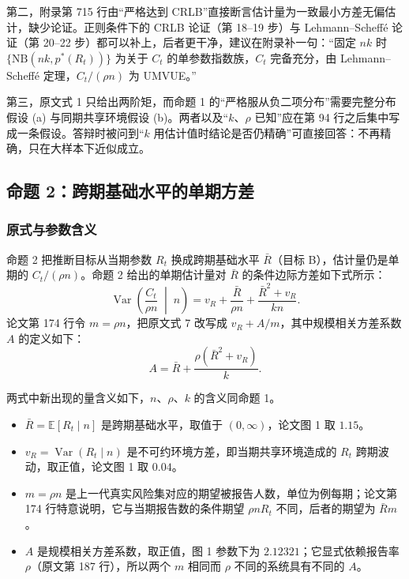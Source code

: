 第二，附录第 715 行由“严格达到 CRLB”直接断言估计量为一致最小方差无偏估计，缺少论证。正则条件下的 CRLB 论证（第 18--19 步）与 Lehmann--Scheffé 论证（第 20--22 步）都可以补上，后者更干净，建议在附录补一句：“固定 $nk$ 时 $\{\mathrm{NB}(nk,p^*(R_t))\}$ 为关于 $C_t$ 的单参数指数族，$C_t$ 完备充分，由 Lehmann--Scheffé 定理，$C_t/(\rho n)$ 为 UMVUE。”

第三，原文式 1 只给出两阶矩，而命题 1 的“严格服从负二项分布”需要完整分布假设 (a) 与同期共享环境假设 (b)。两者以及“$k$、$\rho$ 已知”应在第 94 行之后集中写成一条假设。答辩时被问到“$k$ 用估计值时结论是否仍精确”可直接回答：不再精确，只在大样本下近似成立。

\subsection{命题 2：跨期基础水平的单期方差}

\subsubsection{原式与参数含义}

命题 2 把推断目标从当期参数 $R_t$ 换成跨期基础水平 $\bar R$（目标 B），估计量仍是单期的 $C_t/(\rho n)$。命题 2 给出的单期估计量对 $\bar R$ 的条件边际方差如下式所示：
\begin{equation*}
\operatorname{Var}\!\left(\frac{C_t}{\rho n} \;\middle|\; n\right) = v_R + \frac{\bar{R}}{\rho n} + \frac{\bar{R}^2 + v_R}{k n}.
\tag{原文式 7}
\end{equation*}
论文第 174 行令 $m=\rho n$，把原文式 7 改写成 $v_R+A/m$，其中规模相关方差系数 $A$ 的定义如下：
\begin{equation*}
A = \bar{R} + \frac{\rho(\bar{R}^2 + v_R)}{k}.
\tag{原文式 8}
\end{equation*}

两式中新出现的量含义如下，$n$、$\rho$、$k$ 的含义同命题 1。
\begin{itemize}
\item $\bar R=\mathbb{E}[R_t\mid n]$ 是跨期基础水平，取值于 $(0,\infty)$，论文图 1 取 $1.15$。
\item $v_R=\operatorname{Var}(R_t\mid n)$ 是不可约环境方差，即当期共享环境造成的 $R_t$ 跨期波动，取正值，论文图 1 取 $0.04$。
\item $m=\rho n$ 是上一代真实风险集对应的期望被报告人数，单位为例每期；论文第 174 行特意说明，它与当期报告数的条件期望 $\rho nR_t$ 不同，后者的期望为 $\bar R m$。
\item $A$ 是规模相关方差系数，取正值，图 1 参数下为 $2.12321$；它显式依赖报告率 $\rho$（原文第 187 行），所以两个 $m$ 相同而 $\rho$ 不同的系统具有不同的 $A$。
\end{itemize}


